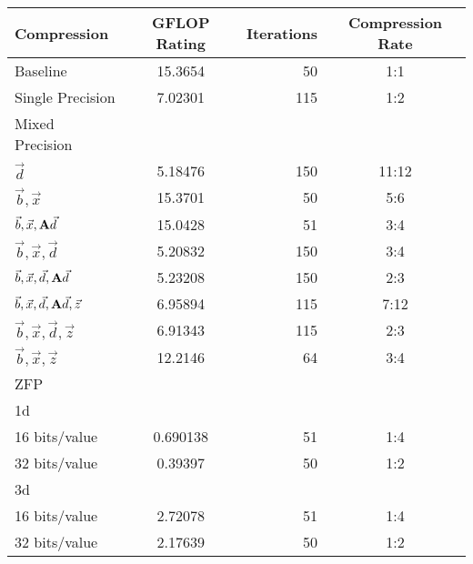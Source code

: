 \begin{table}
	\centering
	\begin{tabular}{l|S|r|c}
		Compression & {GFLOP Rating} & Iterations & Compression Rate\\
		\hline
		Baseline & 15.3654 & 50 & 1:1 \\ %
		Single Precision & 7.02301 & 115 & 1:2 \\
		Mixed Precision & & & \\ %
		\hspace{3mm} \(\vec{d}\) & 5.18476 & 150 & 11:12 \\
		\hspace{3mm} \(\vec{b}, \vec{x}\) & 15.3701 & 50 & 5:6 \\
		\hspace{3mm} \(\vec{b}, \vec{x}, \mathbf{A}\vec{d}\) & 15.0428 & 51 & 3:4 \\
		\hspace{3mm} \(\vec{b}, \vec{x}, \vec{d}\) & 5.20832 & 150 & 3:4 \\ %
		\hspace{3mm} \(\vec{b}, \vec{x}, \vec{d}, \mathbf{A}\vec{d}\) & 5.23208 & 150 & 2:3 \\
		\hspace{3mm} \(\vec{b}, \vec{x}, \vec{d}, \mathbf{A}\vec{d}, \vec{z}\) & 6.95894 & 115 & 7:12 \\
		\hspace{3mm} \(\vec{b}, \vec{x}, \vec{d}, \vec{z}\) & 6.91343 & 115 & 2:3 \\
		\hspace{3mm} \(\vec{b}, \vec{x}, \vec{z}\) & 12.2146 & 64 & 3:4 \\
		ZFP & & & \\
		\hspace{3mm} 1d & & & \\
			\hspace{6mm} 16 bits/value & 0.690138 & 51 & 1:4 \\
			\hspace{6mm} 32 bits/value & 0.39397 & 50 & 1:2 \\
		\hspace{3mm} 3d & & & \\
			\hspace{6mm} 16 bits/value & 2.72078 & 51 & 1:4 \\
			\hspace{6mm} 32 bits/value & 2.17639 & 50 & 1:2 \\

\end{tabular}
\end{table}
